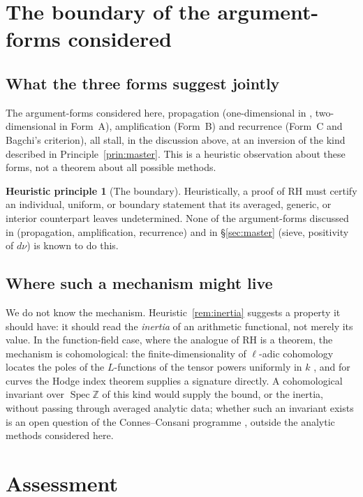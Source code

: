 \documentclass[11pt]{amsart}
\theoremstyle{definition}
\newtheorem{principle}[theorem]{Heuristic principle}
\theoremstyle{remark}
\newcommand{\bbZ}{\mathbb{Z}}
\newcommand{\dnu}{d\nu}
\DeclareMathOperator{\Spec}{Spec}
\begin{document}
\section{The boundary of the argument-forms considered}\label{sec:boundary}

\subsection{What the three forms suggest jointly}
The argument-forms considered here, propagation (one-dimensional in \cite{P27},
two-dimensional in Form~A), amplification (Form~B) and recurrence (Form~C and
Bagchi's criterion), all stall, in the discussion above, at an inversion of
the kind described in Principle~\ref{prin:master}. This is a heuristic
observation about these forms, not a theorem about all possible methods.

\begin{principle}[The boundary]\label{prin:boundary}
Heuristically, a proof of RH must certify an individual, uniform, or boundary
statement that its averaged, generic, or interior counterpart leaves
undetermined. None of the argument-forms discussed in \cite{P27,P28}
(propagation, amplification, recurrence) and in \S\ref{sec:master} (sieve,
positivity of $\dnu$) is known to do this.
\end{principle}

\subsection{Where such a mechanism might live}
We do not know the mechanism. Heuristic~\ref{rem:inertia} suggests a property
it should have: it should read the \emph{inertia} of an arithmetic functional,
not merely its value. In the function-field case, where the analogue of RH is
a theorem, the mechanism is cohomological: the finite-dimensionality of
$\ell$-adic cohomology locates the poles of the $L$-functions of the tensor
powers uniformly in $k$ \cite{bgDeligne}, and for curves the Hodge index
theorem supplies a signature directly. A cohomological invariant over
$\Spec\bbZ$ of this kind would supply the bound, or the inertia, without passing through averaged analytic data;
whether such an invariant exists is an open question of the
Connes--Consani programme \cite{bgConnes99,CCM25}, outside the analytic
methods considered here.

\section{Assessment}\label{sec:assessment}
\end{document}
